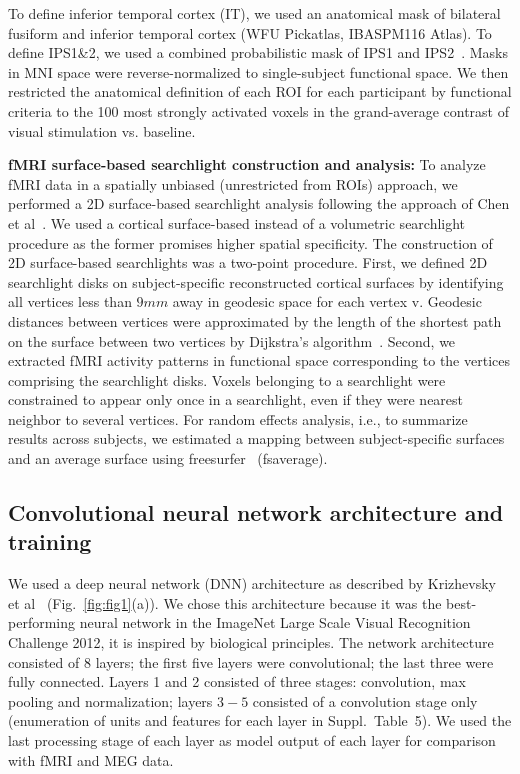 \documentclass[10pt,twocolumn,letterpaper]{article}
\begin{document}
To define inferior temporal cortex (IT), we used an anatomical mask of bilateral fusiform and inferior temporal cortex (WFU Pickatlas, IBASPM116 Atlas). To define IPS1\&2, we used a combined probabilistic mask of IPS1 and IPS2~\cite{wang2014probabilistic}. Masks in MNI space were reverse-normalized to single-subject functional space. We then restricted the anatomical definition of each ROI for each participant by functional criteria to the 100 most strongly activated voxels in the grand-average contrast of visual stimulation vs. baseline.

\textbf{fMRI surface-based searchlight construction and analysis:}
To analyze fMRI data in a spatially unbiased (unrestricted from ROIs) approach, we performed a 2D surface-based searchlight analysis following the approach of Chen et al~\cite{chen2011cortical}. We used a cortical surface-based instead of a volumetric searchlight procedure as the former promises higher spatial specificity. The construction of 2D surface-based searchlights was a two-point procedure. First, we defined 2D searchlight disks on subject-specific reconstructed cortical surfaces by identifying all vertices less than $9mm$ away in geodesic space for each vertex v. Geodesic distances between vertices were approximated by the length of the shortest path on the surface between two vertices by Dijkstra's algorithm~\cite{dale1999cortical}. Second, we extracted fMRI activity patterns in functional space corresponding to the vertices comprising the searchlight disks. Voxels belonging to a searchlight were constrained to appear only once in a searchlight, even if they were nearest neighbor to several vertices. For random effects analysis, i.e., to summarize results across subjects, we estimated a mapping between subject-specific surfaces and an average surface using freesurfer~\cite{dale1999cortical} (fsaverage).

\subsection{Convolutional neural network architecture and training}

We used a deep neural network (DNN) architecture as described by Krizhevsky et al~\cite{krizhevsky2012imagenet} (Fig.~\ref{fig:fig1}(a)). We chose this architecture because it was the best-performing neural network in the ImageNet Large Scale Visual Recognition Challenge 2012, it is inspired by biological principles. The network architecture consisted of 8 layers; the first five layers were convolutional; the last three were fully connected. Layers 1 and 2 consisted of three stages: convolution, max pooling and normalization; layers $3-5$ consisted of a convolution stage only (enumeration of units and features for each layer in Suppl.~Table~5). We used the last processing stage of each layer as model output of each layer for comparison with fMRI and MEG data.
\end{document}
